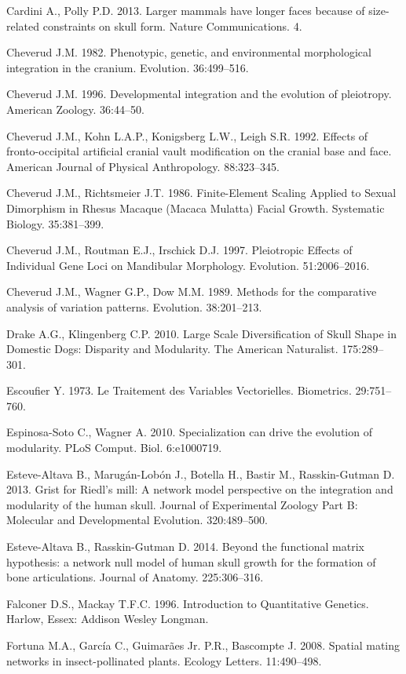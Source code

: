 \documentclass[12pt,]{article}
\begin{document}
Cardini A., Polly P.D. 2013. Larger mammals have longer faces because of
size-related constraints on skull form. Nature Communications. 4.

Cheverud J.M. 1982. Phenotypic, genetic, and environmental morphological
integration in the cranium. Evolution. 36:499--516.

Cheverud J.M. 1996. Developmental integration and the evolution of
pleiotropy. American Zoology. 36:44--50.

Cheverud J.M., Kohn L.A.P., Konigsberg L.W., Leigh S.R. 1992. Effects of
fronto-occipital artificial cranial vault modification on the cranial
base and face. American Journal of Physical Anthropology. 88:323--345.

Cheverud J.M., Richtsmeier J.T. 1986. Finite-Element Scaling Applied to
Sexual Dimorphism in Rhesus Macaque (Macaca Mulatta) Facial Growth.
Systematic Biology. 35:381--399.

Cheverud J.M., Routman E.J., Irschick D.J. 1997. Pleiotropic Effects of
Individual Gene Loci on Mandibular Morphology. Evolution. 51:2006--2016.

Cheverud J.M., Wagner G.P., Dow M.M. 1989. Methods for the comparative
analysis of variation patterns. Evolution. 38:201--213.

Drake A.G., Klingenberg C.P. 2010. Large Scale Diversification of Skull
Shape in Domestic Dogs: Disparity and Modularity. The American
Naturalist. 175:289--301.

Escoufier Y. 1973. Le Traitement des Variables Vectorielles. Biometrics.
29:751--760.

Espinosa-Soto C., Wagner A. 2010. Specialization can drive the evolution
of modularity. PLoS Comput. Biol. 6:e1000719.

Esteve-Altava B., Marugán-Lobón J., Botella H., Bastir M.,
Rasskin-Gutman D. 2013. Grist for Riedl's mill: A network model
perspective on the integration and modularity of the human skull.
Journal of Experimental Zoology Part B: Molecular and Developmental
Evolution. 320:489--500.

Esteve-Altava B., Rasskin-Gutman D. 2014. Beyond the functional matrix
hypothesis: a network null model of human skull growth for the formation
of bone articulations. Journal of Anatomy. 225:306--316.

Falconer D.S., Mackay T.F.C. 1996. Introduction to Quantitative
Genetics. Harlow, Essex: Addison Wesley Longman.

Fortuna M.A., García C., Guimarães Jr. P.R., Bascompte J. 2008. Spatial
mating networks in insect-pollinated plants. Ecology Letters.
11:490--498.
\end{document}
